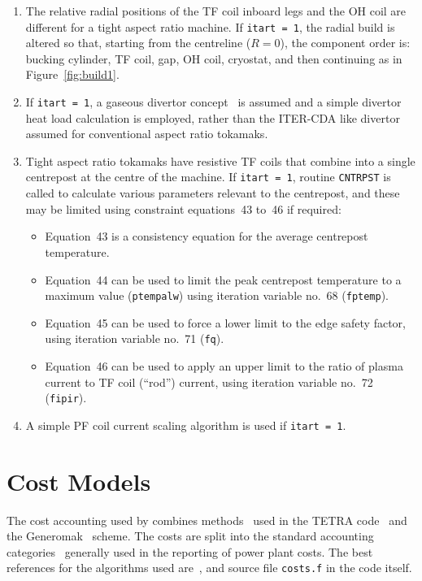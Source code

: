 \begin{enumerate}
\item The relative radial positions of the TF coil inboard legs and the OH coil
are different for a tight aspect ratio machine. If \texttt{itart = 1}, the
radial build is altered so that, starting from the centreline ($R = 0$), the
component order is: bucking cylinder, TF coil, gap, OH coil, cryostat, and
then continuing as in Figure~\ref{fig:build1}.
\item If \texttt{itart = 1}, a gaseous divertor concept~\cite{storac} is
assumed and a simple divertor heat load calculation is employed, rather than
the ITER-CDA like divertor assumed for conventional aspect ratio tokamaks.
\item Tight aspect ratio tokamaks have resistive TF coils that combine into a
single centrepost at the centre of the machine. If \texttt{itart = 1}, routine
\texttt{CNTRPST} is called to calculate various parameters relevant to the
centrepost, and these may be limited using constraint equations~43 to~46 if
required:
\begin{itemize}
\item Equation~43 is a consistency equation for the average centrepost
temperature.
\item Equation~44 can be used to limit the peak centrepost temperature to a
maximum value (\texttt{ptempalw}) using iteration variable no.\ 68
(\texttt{fptemp}).
\item Equation~45 can be used to force a lower limit to the edge safety
factor, using iteration variable no.\ 71 (\texttt{fq}).
\item Equation~46 can be used to apply an upper limit to the ratio of plasma
current to TF coil (``rod'') current, using iteration variable no.\ 72
(\texttt{fipir}).
\end{itemize}
\item A simple PF coil current scaling algorithm is used if \texttt{itart = 1}.
\end{enumerate}

\section{Cost Models}

The cost accounting used by \PS combines methods~\cite{cost1} used in the
TETRA code~\cite{tetra} and the Generomak~\cite{generomak} scheme.  The costs
are split into the standard accounting categories~\cite{cost2} generally used
in the reporting of power plant costs. The best references for the algorithms
used are~\cite{storac}, and source file {\tt costs.f} in the code itself.
\setlength{\parskip}{5mm}


